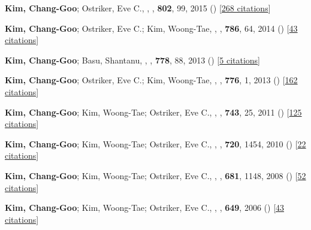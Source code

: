 \item[{8.}]\textbf{Kim, Chang-Goo}; Ostriker, Eve C., , \apj, \textbf{802}, 99, 2015 () [\href{http://adsabs.harvard.edu/abs/2015ApJ...802...99K}{268 citations}]

\item[{7.}]\textbf{Kim, Chang-Goo}; Ostriker, Eve C.; Kim, Woong-Tae, , \apj, \textbf{786}, 64, 2014 () [\href{http://adsabs.harvard.edu/abs/2014ApJ...786...64K}{43 citations}]

\item[{6.}]\textbf{Kim, Chang-Goo}; Basu, Shantanu, , \apj, \textbf{778}, 88, 2013 () [\href{http://adsabs.harvard.edu/abs/2013ApJ...778...88K}{5 citations}]

\item[{5.}]\textbf{Kim, Chang-Goo}; Ostriker, Eve C.; Kim, Woong-Tae, , \apj, \textbf{776}, 1, 2013 () [\href{http://adsabs.harvard.edu/abs/2013ApJ...776....1K}{162 citations}]

\item[{4.}]\textbf{Kim, Chang-Goo}; Kim, Woong-Tae; Ostriker, Eve C., , \apj, \textbf{743}, 25, 2011 () [\href{http://adsabs.harvard.edu/abs/2011ApJ...743...25K}{125 citations}]

\item[{3.}]\textbf{Kim, Chang-Goo}; Kim, Woong-Tae; Ostriker, Eve C., , \apj, \textbf{720}, 1454, 2010 () [\href{http://adsabs.harvard.edu/abs/2010ApJ...720.1454K}{22 citations}]

\item[{2.}]\textbf{Kim, Chang-Goo}; Kim, Woong-Tae; Ostriker, Eve C., , \apj, \textbf{681}, 1148, 2008 () [\href{http://adsabs.harvard.edu/abs/2008ApJ...681.1148K}{52 citations}]

\item[{1.}]\textbf{Kim, Chang-Goo}; Kim, Woong-Tae; Ostriker, Eve C., , \apj, \textbf{649}, 2006 () [\href{http://adsabs.harvard.edu/abs/2006ApJ...649L..13K}{43 citations}]